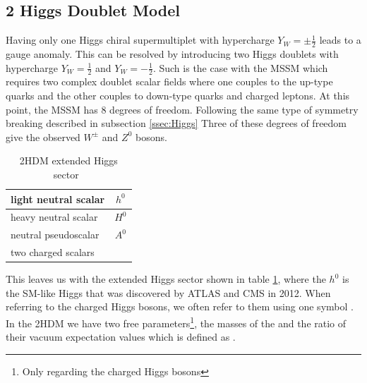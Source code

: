 	\subsection{2 Higgs Doublet Model}\label{ssec:2HDM}
		Having only one Higgs chiral supermultiplet with hypercharge $Y_W=\pm \frac{1}{2}$ leads to a gauge anomaly. This can be resolved by introducing two Higgs doublets with hypercharge $Y_W=\frac{1}{2}$ and $Y_W=-\frac{1}{2}$. Such is the case with the MSSM which requires two complex doublet scalar fields where one couples to the up-type quarks and the other couples to down-type quarks and charged leptons. At this point, the MSSM has 8 degrees of freedom. Following the same type of symmetry breaking described in subsection \ref{ssec:Higgs} Three of these degrees of freedom give the observed $W^\pm$ and $Z^0$ bosons. 
		\begin{table}[!thp]
				\centering
				\caption{2HDM extended Higgs sector~\cite{2HDM}}
				\begin{tabular}{| l | c |}
				\hline
				light neutral scalar 	& $h^0$ \\ \hline
				heavy neutral scalar 	& $H^0$ \\ \hline
				neutral pseudoscalar 	& $A^0$ \\ \hline
				two charged scalars 	& \Hpm \\ \hline
 				\end{tabular}
				\label{tab:2HDM}
		\end{table}
		This leaves us with the extended Higgs sector shown in table \ref{tab:2HDM}, where the $h^0$ is the SM-like Higgs that was discovered by ATLAS and CMS in 2012. When referring to the charged Higgs bosons, we often refer to them using one symbol \Hpm. In the 2HDM we have two free parameters\footnote{Only regarding the charged Higgs bosons}, the masses of the \Hpm and the ratio of their vacuum expectation values which is defined as \tanb. 



